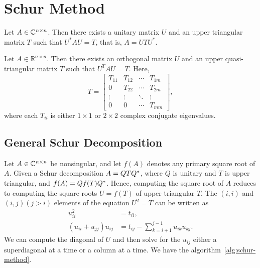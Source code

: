 \documentclass{article}
\begin{document}
\section{Schur Method}
\begin{theorem} 
  Let $A \in \mathbb{C}^{n \times n}$. Then there exists a unitary matrix $U$ and
  an upper triangular matrix $T$ such that $U^* A U=T$, that is,
  $A=U T U^*$.
\end{theorem}

\begin{theorem}
  Let $A \in \mathbb{R}^{n \times n}$. Then there exists an orthogonal
  matrix $U$ and an upper quasi-triangular matrix $T$ such that
  $U^T A U=T$. Here,
  \begin{equation*}
    T=\left[
      \begin{array}{cccc}
        T_{11} & T_{12} & \cdots & T_{1 m} \\
        0 & T_{22} & \cdots & T_{2 m} \\
        \vdots & \vdots & \ddots & \vdots \\
        0 & 0 & \cdots & T_{m m}
      \end{array}\right],
  \end{equation*}
  where each $T_{i i}$ is either $1 \times 1$ or $2 \times 2$ complex
  conjugate eigenvalues.
\end{theorem}


\subsection{General Schur Decomposition}
Let $A\in\mathbb{C}^{n\times n}$ be nonsingular, and let $f(A)$ denotes any primary square
root of $A$. Given a Schur decomposition $A = QTQ^{*}$, where $Q$ is
unitary and $T$ is upper triangular, and $f(A) = Qf(T)Q^{*}$. Hence,
computing the square root of $A$ reduces to computing the square roots
$U = f(T)$ of upper triangular $T$. The $(i,i)$ and $(i,j)(j > i)$ elements
of the equation $U^2 = T$ can be written as
\begin{equation}\label{eq:schur-method}
  \begin{aligned}
    u_{ii}^2 & = t_{ii}, \\
    (u_{ii} + u_{jj})u_{ij} & = t_{ij} - \sum_{k = i + 1}^{j-1}u_{ik}u_{kj}.
  \end{aligned}
\end{equation}
We can compute the diagonal of $U$ and then solve for the $u_{ij}$ either a
superdiagonal at a time or a column at a time. We have the
algorithm~\ref{alg:schur-method}.
\end{document}

